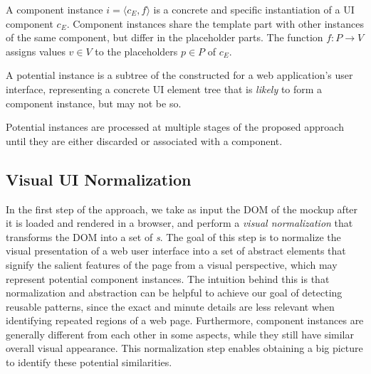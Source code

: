 \begin{defn}
A component instance $i=\langle c_E, f \rangle$ is a concrete and specific instantiation of a UI component $c_E$. 
Component instances share the template part with other instances of the same component, 
but differ in the placeholder parts.
The function $f: P \rightarrow V$ assigns values $v \in V$ to the placeholders $p \in P$ of $c_E$.
\end{defn}

\begin{defn}
A potential instance is a subtree of the \dom 
constructed for a web application's user interface,
representing a concrete UI element tree 
that is \emph{likely} to form a component instance, but may not be so. 
\end{defn}

Potential instances are processed at multiple stages of the proposed approach 
until they are either discarded or associated with a component.


\subsection{Visual UI Normalization}
In the first step of the approach, we take as input the DOM of the mockup after it is loaded and rendered in a browser,
and perform a \emph{visual normalization} that transforms the DOM into a set of \emph{{\VizElem}s}.
The goal of this step is to normalize the visual presentation of a web user interface into a set of abstract elements 
that signify the salient features of the page from a visual perspective, which may represent potential component instances.
The intuition behind this is that normalization and abstraction can be helpful to achieve our goal of detecting reusable patterns, since the exact and minute details are less relevant when identifying repeated regions of a web page. 
Furthermore, component instances are generally different from each other in some aspects, while they still have similar overall visual appearance. 
This normalization step enables obtaining a big picture to identify these potential similarities.%


